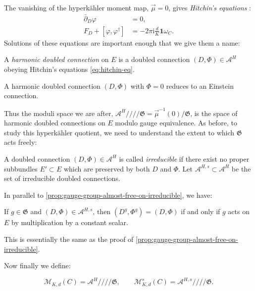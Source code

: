 \documentclass[12pt,letterpaper,reqno]{article}
\numberwithin{equation}{section}
\newcommand{\fG}{{\mathfrak G}}
\newcommand{\cM}{\ensuremath{\mathcal M}}
\newcommand{\cA}{\ensuremath{\mathcal A}}
\newcommand{\hk}{hyperk\"ahler\xspace}
\newcommand{\hkq}{/\!\!/\!\!/\!\!/}
\newcommand{\I}{{\mathrm i}}
\newcommand\bid{{\mathbf 1}}
\newcommand{\ti}[1]{\textit{#1}}
\begin{document}
The vanishing of the \hk moment map, $\vec\mu = 0$, gives \ti{Hitchin's equations} \cite{MR89a:32021}:
\begin{subequations} \label{eq:hitchin-eq}
\begin{align}
\bar\partial_D \varphi &= 0, \\
F_D + [\varphi,\varphi^\dagger] &= -2 \pi \I \frac{d}{K} \bid \omega_C.
\end{align}
\end{subequations}
Solutions of these equations are important enough that we give them a name:
\begin{defn}
A \ti{harmonic doubled connection} on $E$ is a doubled connection 
$(D,\Phi) \in \cA^H$
obeying Hitchin's equations \eqref{eq:hitchin-eq}.
\end{defn}

A harmonic doubled connection $(D,\Phi)$ with $\Phi = 0$ reduces to an
Einstein connection.

Thus the moduli space we are after, $\cA^H \hkq \fG = \vec\mu^{-1}(0) / \fG$,
is the space of harmonic doubled connections on $E$ modulo gauge equivalence.
As before, to study this \hk quotient,
we need to understand the extent to which
$\fG$ acts freely:

\begin{defn} A doubled 
connection $(D,\Phi) \in \cA^H$
is called \ti{irreducible} if there exist no proper subbundles $E' \subset E$
which are preserved by both $D$ and $\Phi$. Let $\cA^{H,s} \subset \cA^H$
be the set of irreducible doubled connections.
\end{defn}

In parallel to \autoref{prop:gauge-group-almost-free-on-irreducible},
we have:
\begin{prop}
If $g \in \fG$ and $(D,\Phi) \in \cA^{H,s}$, then
$(D^g,\Phi^g) = (D,\Phi)$
if and only if $g$ acts on $E$ by multiplication by a constant scalar.
\end{prop}
\begin{pf} This is essentially the same as the proof of
\autoref{prop:gauge-group-almost-free-on-irreducible}.
\end{pf}

Now finally we define:
\begin{defn}
\begin{equation}
  \cM_{K,d}(C) = \cA^H \hkq \fG, \qquad \cM^s_{K,d}(C) = \cA^{H,s} \hkq \fG.
\end{equation}
\end{defn}
\end{document}

